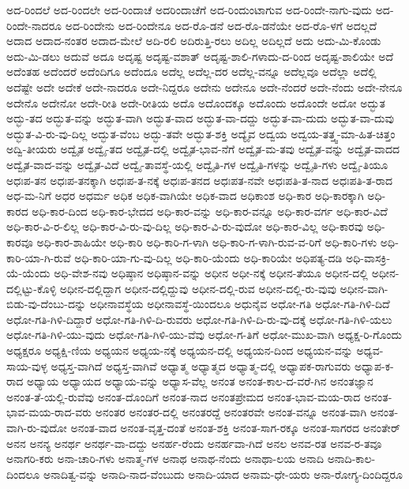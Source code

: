 ಅದ-ರಿಂದಲೆ
ಅದ-ರಿಂದಲೇ
ಅದ-ರಿಂದಾಚೆ
ಅದರಿಂದಾಚೆಗೆ
ಅದ-ರಿಂದುಂಟಾಗುವ
ಅದ-ರಿಂದೇ-ನಾಗು-ವುದು
ಅದ-ರಿಂದೇ-ನಾದರೂ
ಅದ-ರಿಂದೇನು
ಅದ-ರಿಂದೇನೂ
ಅದ-ರೊ-ಡನೆ
ಅದ-ರೊ-ಡನೆಯೇ
ಅದ-ರೊ-ಳಗೆ
ಅದಲ್ಲದೆ
ಅದಾದ
ಅದಾದ-ನಂತರ
ಅದಾದ-ಮೇಲೆ
ಅದಿ-ರಲಿ
ಅದಿರುತ್ತಿ-ರಲು
ಅದಿಲ್ಲ
ಅದಿಲ್ಲದೆ
ಅದು
ಅದು-ಮಿ-ಕೊಂಡು
ಅದು-ಮಿ-ಡಲು
ಅದುವೆ
ಅದೂ
ಅದೃಷ್ಟ
ಅದೃಷ್ಟ-ವಶಾತ್
ಅದೃಷ್ಟ-ಶಾಲಿ-ಗಳಾದು-ದ-ರಿಂದ
ಅದೃಷ್ಟ-ಶಾಲಿಯೇ
ಅದೆ
ಅದೆಂತಹ
ಅದೆಂದರೆ
ಅದೆಂದಿಗೂ
ಅದೆಂದೂ
ಅದೆಲ್ಲ
ಅದೆಲ್ಲ-ದರ
ಅದೆಲ್ಲ-ವನ್ನೂ
ಅದೆಲ್ಲವೂ
ಅದೆಲ್ಲಾ
ಅದೆಲ್ಲಿ
ಅದೆಷ್ಟೇ
ಅದೇ
ಅದೇಕೆ
ಅದೇ-ನಾದರೂ
ಅದೇ-ನಿದ್ದರೂ
ಅದೇನು
ಅದೇನೂ
ಅದೇ-ನೆಂದರೆ
ಅದೇ-ನೆಂದು
ಅದೇ-ನೇನೂ
ಅದೇನೊ
ಅದೇನೋ
ಅದೇ-ರೀತಿ
ಅದೇ-ರೀತಿಯ
ಅದೊ
ಅದೊಂದಕ್ಕೂ
ಅದೊಂದು
ಅದೊಂದೇ
ಅದೋ
ಅದ್ಭುತ
ಅದ್ಭು-ತದ
ಅದ್ಭುತ-ವನ್ನು
ಅದ್ಭುತ-ವಾಗಿ
ಅದ್ಭುತ-ವಾದ
ಅದ್ಭುತ-ವಾ-ದದ್ದು
ಅದ್ಭುತ-ವಾ-ದುದು
ಅದ್ಭುತ-ವಾ-ದುವು
ಅದ್ಭುತ-ವಿ-ರು-ವು-ದಿಲ್ಲ
ಅದ್ಭುತ-ವೆಂಬ
ಅದ್ಭು-ತವೇ
ಅದ್ಭುತ-ಶಕ್ತಿ
ಅದ್ಯೈವ
ಅದ್ವಯ
ಅದ್ವಯ-ತತ್ತ್ವ-ಮಾ-ಹಿತ-ಚಿತ್ತಂ
ಅದ್ವಿ-ತೀಯರು
ಅದ್ವೈತ
ಅದ್ವೈ-ತದ
ಅದ್ವೈತ-ದಲ್ಲಿ
ಅದ್ವೈತ-ಭಾವ-ನೆಗೆ
ಅದ್ವೈತ-ಮ-ತವು
ಅದ್ವೈತ-ವನ್ನು
ಅದ್ವೈತ-ವಾದದ
ಅದ್ವೈತ-ವಾದ-ವನ್ನು
ಅದ್ವೈತ-ವಿದೆ
ಅದ್ವೈ-ತಾವಸ್ಥೆ-ಯಲ್ಲಿ
ಅದ್ವೈತಿ-ಗಳ
ಅದ್ವೈತಿ-ಗಳನ್ನು
ಅದ್ವೈತಿ-ಗಳು
ಅದ್ವೈ-ತಿಯೂ
ಅಧಃಪ-ತನ
ಅಧಃಪ-ತನಕ್ಕಾಗಿ
ಅಧಃಪ-ತ-ನಕ್ಕೆ
ಅಧಃಪ-ತನದ
ಅಧಃಪತ-ನವೇ
ಅಧಃಪತಿ-ತ-ನಾದ
ಅಧಃಪತಿ-ತ-ರಾದ
ಅಧ-ಮ-ನಿಗೆ
ಅಧರ
ಅಧರ್ಮ
ಅಧಿಕ
ಅಧಿಕ-ವಾಗಿಯೇ
ಅಧಿಕ-ವಾದ
ಅಧಿಕಾಂಶ
ಅಧಿ-ಕಾರ
ಅಧಿ-ಕಾರಕ್ಕಾಗಿ
ಅಧಿ-ಕಾರದ
ಅಧಿ-ಕಾರ-ದಿಂದ
ಅಧಿ-ಕಾರ-ಭೇದದ
ಅಧಿ-ಕಾರ-ವನ್ನು
ಅಧಿ-ಕಾರ-ವನ್ನೂ
ಅಧಿ-ಕಾರ-ವರ್ಗ
ಅಧಿ-ಕಾರ-ವಿದೆ
ಅಧಿ-ಕಾರ-ವಿ-ರ-ಲಿಲ್ಲ
ಅಧಿ-ಕಾರ-ವಿ-ರು-ವು-ದಿಲ್ಲ
ಅಧಿ-ಕಾರ-ವಿ-ರು-ವುದೋ
ಅಧಿ-ಕಾರ-ವಿಲ್ಲ
ಅಧಿ-ಕಾರವು
ಅಧಿ-ಕಾರವೂ
ಅಧಿ-ಕಾರ-ಶಾಹಿಯೇ
ಅಧಿ-ಕಾರಿ
ಅಧಿ-ಕಾರಿ-ಗ-ಳಾಗಿ
ಅಧಿ-ಕಾರಿ-ಗ-ಳಾಗಿ-ರುವ-ವ-ರಿಗೆ
ಅಧಿ-ಕಾರಿ-ಗಳು
ಅಧಿ-ಕಾರಿ-ಯಾ-ಗಿ-ರುವೆ
ಅಧಿ-ಕಾರಿ-ಯಾ-ಗು-ವು-ದಿಲ್ಲ
ಅಧಿ-ಕಾರಿ-ಯೆಂದು
ಅಧಿ-ಕಾರಿಯೇ
ಅಧಿಪತ್ಯ-ದಡಿ
ಅಧಿ-ವಾಸಕ್ರಿ-ಯೆ-ಯೆಂದು
ಅಧಿ-ವೇಶ-ನವು
ಅಧಿಷ್ಠಾನ
ಅಧಿಷ್ಠಾನ-ವನ್ನು
ಅಧೀನ
ಅಧೀ-ನಕ್ಕೆ
ಅಧೀನ-ತೆಯೂ
ಅಧೀನ-ದಲ್ಲಿ
ಅಧೀನ-ದಲ್ಲಿಟ್ಟು-ಕೊಳ್ಳಿ
ಅಧೀನ-ದಲ್ಲಿದ್ದಾಗ
ಅಧೀನ-ದಲ್ಲಿದ್ದುವು
ಅಧೀನ-ದಲ್ಲಿ-ರುವ
ಅಧೀನ-ದಲ್ಲಿ-ರು-ವುವು
ಅಧೀನ-ವಾಗಿ-ಬಿಡು-ವು-ದೆಂಬು-ದನ್ನು
ಅಧೀನಾವಸ್ಥೆಯ
ಅಧೀನಾವಸ್ಥೆ-ಯಿಂದಲೂ
ಅಧುನೈವ
ಅಧೋ-ಗತಿ
ಅಧೋ-ಗತಿ-ಗಿಳಿ-ದಿದೆ
ಅಧೋ-ಗತಿ-ಗಿಳಿ-ದಿದ್ದಾರೆ
ಅಧೋ-ಗತಿ-ಗಿಳಿ-ದಿ-ರುವರು
ಅಧೋ-ಗತಿ-ಗಿಳಿ-ದಿ-ರು-ವು-ದಕ್ಕೆ
ಅಧೋ-ಗತಿ-ಗಿಳಿ-ಯಲು
ಅಧೋ-ಗತಿ-ಗಿಳಿ-ಯು-ವುದು
ಅಧೋ-ಗತಿ-ಗಿಳಿ-ಯು-ವೆವು
ಅಧೋ-ಗ-ತಿಗೆ
ಅಧೋ-ಮುಖ-ವಾಗಿ
ಅಧ್ಯಕ್ಷ-ರಿ-ಗೊಂದು
ಅಧ್ಯಕ್ಷರೂ
ಅಧ್ಯಕ್ಷಿ-ಣಿಯ
ಅಧ್ಯಯನ
ಅಧ್ಯಯ-ನಕ್ಕೆ
ಅಧ್ಯಯನ-ದಲ್ಲಿ
ಅಧ್ಯಯನ-ದಿಂದ
ಅಧ್ಯಯನ-ವನ್ನು
ಅಧ್ಯವ-ಸಾಯ-ವುಳ್ಳ
ಅಧ್ಯಸ್ತ-ವಾಗಿದೆ
ಅಧ್ಯಸ್ತ-ವಾಗಿವೆ
ಅಧ್ಯಾತ್ಮ
ಅಧ್ಯಾತ್ಮದ
ಅಧ್ಯಾತ್ಮ-ದಲ್ಲಿ
ಅಧ್ಯಾಪಕ-ರಾಗುವರು
ಅಧ್ಯಾಪ-ಕ-ರಾದ
ಅಧ್ಯಾಯ
ಅಧ್ಯಾಯದ
ಅಧ್ಯಾಯ-ವನ್ನು
ಅಧ್ಯಾಸ-ವೆಲ್ಲ
ಅನಂತ
ಅನಂತ-ಕಾಲ-ದ-ವರೆ-ಗಿನ
ಅನಂತಜ್ಞಾನ
ಅನಂತ-ತೆ-ಯಲ್ಲಿ-ರುವೆವು
ಅನಂತ-ದೊಂದಿಗೆ
ಅನಂತ-ನಾದ
ಅನಂತಪ್ರೇಮದ
ಅನಂತ-ಭಾವ-ಮಯ-ರಾದ
ಅನಂತ-ಭಾವ-ಮಯ-ರಾದ-ವರು
ಅನಂತರ
ಅನಂತರ-ದಲ್ಲಿ
ಅನಂತರದ್ದೆ
ಅನಂತರವೇ
ಅನಂತ-ವನ್ನೂ
ಅನಂತ-ವಾಗಿ
ಅನಂತ-ವಾಗಿ-ರು-ವುದೋ
ಅನಂತ-ವಾದ
ಅನಂತ-ವೃತ್ತ-ದಂತೆ
ಅನಂತ-ಶಕ್ತಿ
ಅನಂತ-ಸಾಗ-ರಕ್ಕೂ
ಅನಂತ-ಸಾಗರದ
ಅನಂತೇರ್
ಅನನ
ಅನನ್ಯ
ಅನರ್ಥ
ಅನರ್ಥ-ವಾ-ದದ್ದು
ಅನರ್ಹ-ರೆಂದು
ಅನರ್ಹವಾ-ಗಿದೆ
ಅನಲ
ಅನವ-ರತ
ಅನವ-ರ-ತವೂ
ಅನಾಗರಿ-ಕರು
ಅನಾ-ಚಾರಿ-ಗಳು
ಅನಾತ್ಮ-ಗಳ
ಅನಾಥ
ಅನಾಥ-ನೆಂದು
ಅನಾಥಾ-ಲಯ
ಅನಾದಿ
ಅನಾದಿ-ಕಾಲ-ದಿಂದಲೂ
ಅನಾದಿತ್ವ-ವನ್ನು
ಅನಾದಿ-ನಾದ-ವೆಂಬುದು
ಅನಾದಿ-ಯಾದ
ಅನಾಮ-ಧೇ-ಯರು
ಅನಾ-ರೋಗ್ಯ-ದಿಂದಿದ್ದರೂ

